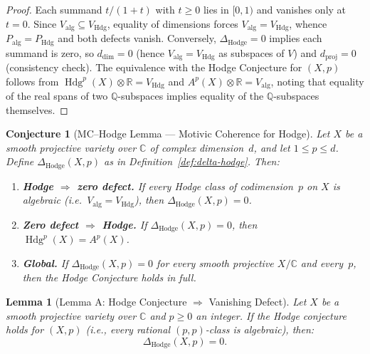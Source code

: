 \documentclass[11pt]{article}
\newtheorem{lemma}[theorem]{Lemma}
\newtheorem{conjecture}[theorem]{Conjecture}
\theoremstyle{definition}
\DeclareMathOperator{\Hdg}{Hdg}
\begin{document}
\begin{proof}
Each summand $t/(1+t)$ with $t\ge 0$ lies in $[0,1)$ and vanishes
only at $t=0$.  Since
$V_{\mathrm{alg}}\subseteq V_{\mathrm{Hdg}}$, equality of dimensions
forces $V_{\mathrm{alg}}=V_{\mathrm{Hdg}}$, whence
$P_{\mathrm{alg}}=P_{\mathrm{Hdg}}$ and both defects vanish.
Conversely, $\Delta_{\mathrm{Hodge}}=0$ implies each summand is zero,
so $d_{\dim}=0$ (hence $V_{\mathrm{alg}}=V_{\mathrm{Hdg}}$ as
subspaces of $V$) and $d_{\mathrm{proj}}=0$ (consistency check).
The equivalence with the Hodge Conjecture for $(X,p)$ follows from
$\Hdg^{p}(X)\otimes\mathbb{R}=V_{\mathrm{Hdg}}$ and
$A^{p}(X)\otimes\mathbb{R}=V_{\mathrm{alg}}$, noting that equality
of the real spans of two $\mathbb{Q}$-subspaces implies equality of
the $\mathbb{Q}$-subspaces themselves.
\end{proof}


\begin{conjecture}[MC--Hodge Lemma --- Motivic Coherence for Hodge]
\label{conj:mc-hodge}
Let $X$ be a smooth projective variety over $\mathbb{C}$ of complex
dimension~$d$, and let $1\le p\le d$.  Define
$\Delta_{\mathrm{Hodge}}(X,p)$ as in
Definition~\textup{\ref{def:delta-hodge}}.  Then:
\begin{enumerate}[label=\textup{(\arabic*)}]
  \item \textbf{Hodge $\Rightarrow$ zero defect.}\;
        If every Hodge class of codimension~$p$ on $X$ is algebraic
        (i.e.\ $V_{\mathrm{alg}}=V_{\mathrm{Hdg}}$), then
        $\Delta_{\mathrm{Hodge}}(X,p)=0$.
  \item \textbf{Zero defect $\Rightarrow$ Hodge.}\;
        If $\Delta_{\mathrm{Hodge}}(X,p)=0$, then
        $\Hdg^{p}(X)=A^{p}(X)$.
  \item \textbf{Global.}\;
        If $\Delta_{\mathrm{Hodge}}(X,p)=0$ for every smooth
        projective $X/\mathbb{C}$ and every~$p$, then the Hodge
        Conjecture holds in full.
\end{enumerate}
\end{conjecture}


\begin{lemma}[Lemma A: Hodge Conjecture $\Rightarrow$ Vanishing Defect]
\label{lem:hodge-A}
Let $X$ be a smooth projective variety over $\mathbb{C}$ and $p \geq 0$ an integer. If the Hodge conjecture holds for $(X, p)$ (i.e., every rational $(p,p)$-class is algebraic), then:
\[
  \Delta_{\mathrm{Hodge}}(X, p) = 0.
\]
\end{lemma}
\end{document}
